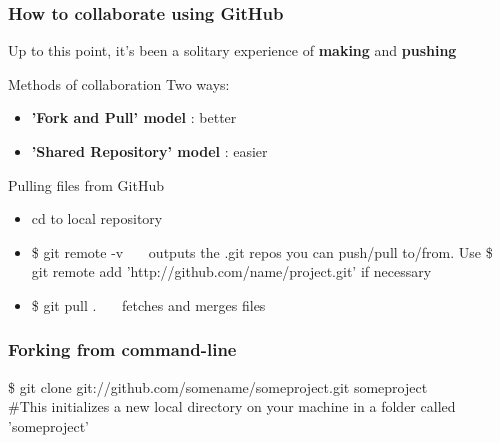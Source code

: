 \documentclass{beamer}\usepackage{graphicx, color}
\begin{document}
\begin{frame}
\frametitle{How to collaborate using GitHub}
Up to this point, it's been a solitary experience of \textbf{making} and \textbf{pushing} \\
 \begin{block}{Methods of collaboration}
Two ways:
\begin{itemize}
 \item \textbf{'Fork and Pull' model} : better
 \item \textbf{'Shared Repository' model} : easier
\end{itemize}
\end{block}


\begin{alertblock}{Pulling files from GitHub}
 \begin{itemize}
  \item cd to local repository
  \item \$ git remote -v  \ \ \  outputs the .git repos you can push/pull to/from. Use \$ git remote add 'http://github.com/name/project.git' if necessary
  \item \$ git pull . \ \ \ fetches and merges files
 \end{itemize}
\end{alertblock}
\end{frame}






\begin{frame}
 \frametitle{Forking from command-line}

 \$ git clone git://github.com/somename/someproject.git someproject \\
\vspace{1cm}
\#This initializes a new local directory on your machine in a folder called 'someproject' \\

\end{frame}
\end{document}
